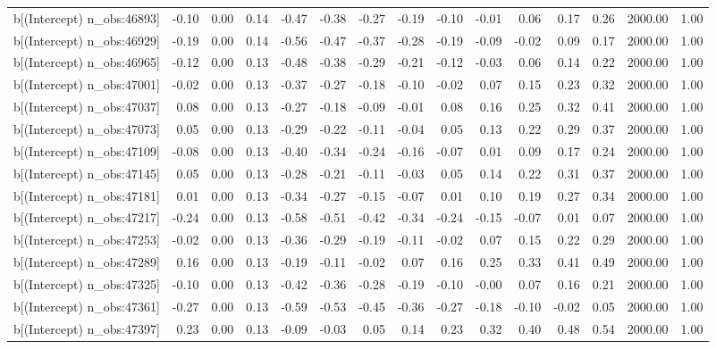 \begin{table}[ht]
\begin{tabular}{rrrrrrrrrrrrrrr}
  b[(Intercept) n\_obs:46893] & -0.10 & 0.00 & 0.14 & -0.47 & -0.38 & -0.27 & -0.19 & -0.10 & -0.01 & 0.06 & 0.17 & 0.26 & 2000.00 & 1.00 \\ 
  b[(Intercept) n\_obs:46929] & -0.19 & 0.00 & 0.14 & -0.56 & -0.47 & -0.37 & -0.28 & -0.19 & -0.09 & -0.02 & 0.09 & 0.17 & 2000.00 & 1.00 \\ 
  b[(Intercept) n\_obs:46965] & -0.12 & 0.00 & 0.13 & -0.48 & -0.38 & -0.29 & -0.21 & -0.12 & -0.03 & 0.06 & 0.14 & 0.22 & 2000.00 & 1.00 \\ 
  b[(Intercept) n\_obs:47001] & -0.02 & 0.00 & 0.13 & -0.37 & -0.27 & -0.18 & -0.10 & -0.02 & 0.07 & 0.15 & 0.23 & 0.32 & 2000.00 & 1.00 \\ 
  b[(Intercept) n\_obs:47037] & 0.08 & 0.00 & 0.13 & -0.27 & -0.18 & -0.09 & -0.01 & 0.08 & 0.16 & 0.25 & 0.32 & 0.41 & 2000.00 & 1.00 \\ 
  b[(Intercept) n\_obs:47073] & 0.05 & 0.00 & 0.13 & -0.29 & -0.22 & -0.11 & -0.04 & 0.05 & 0.13 & 0.22 & 0.29 & 0.37 & 2000.00 & 1.00 \\ 
  b[(Intercept) n\_obs:47109] & -0.08 & 0.00 & 0.13 & -0.40 & -0.34 & -0.24 & -0.16 & -0.07 & 0.01 & 0.09 & 0.17 & 0.24 & 2000.00 & 1.00 \\ 
  b[(Intercept) n\_obs:47145] & 0.05 & 0.00 & 0.13 & -0.28 & -0.21 & -0.11 & -0.03 & 0.05 & 0.14 & 0.22 & 0.31 & 0.37 & 2000.00 & 1.00 \\ 
  b[(Intercept) n\_obs:47181] & 0.01 & 0.00 & 0.13 & -0.34 & -0.27 & -0.15 & -0.07 & 0.01 & 0.10 & 0.19 & 0.27 & 0.34 & 2000.00 & 1.00 \\ 
  b[(Intercept) n\_obs:47217] & -0.24 & 0.00 & 0.13 & -0.58 & -0.51 & -0.42 & -0.34 & -0.24 & -0.15 & -0.07 & 0.01 & 0.07 & 2000.00 & 1.00 \\ 
  b[(Intercept) n\_obs:47253] & -0.02 & 0.00 & 0.13 & -0.36 & -0.29 & -0.19 & -0.11 & -0.02 & 0.07 & 0.15 & 0.22 & 0.29 & 2000.00 & 1.00 \\ 
  b[(Intercept) n\_obs:47289] & 0.16 & 0.00 & 0.13 & -0.19 & -0.11 & -0.02 & 0.07 & 0.16 & 0.25 & 0.33 & 0.41 & 0.49 & 2000.00 & 1.00 \\ 
  b[(Intercept) n\_obs:47325] & -0.10 & 0.00 & 0.13 & -0.42 & -0.36 & -0.28 & -0.19 & -0.10 & -0.00 & 0.07 & 0.16 & 0.21 & 2000.00 & 1.00 \\ 
  b[(Intercept) n\_obs:47361] & -0.27 & 0.00 & 0.13 & -0.59 & -0.53 & -0.45 & -0.36 & -0.27 & -0.18 & -0.10 & -0.02 & 0.05 & 2000.00 & 1.00 \\ 
  b[(Intercept) n\_obs:47397] & 0.23 & 0.00 & 0.13 & -0.09 & -0.03 & 0.05 & 0.14 & 0.23 & 0.32 & 0.40 & 0.48 & 0.54 & 2000.00 & 1.00 \\ 

\end{tabular}
\end{table}
